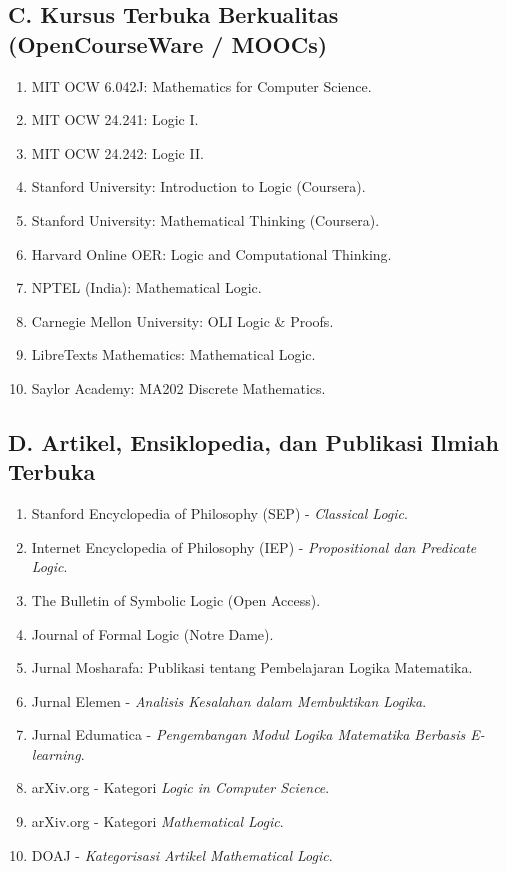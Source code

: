 \documentclass[12pt,a4paper]{article}
\begin{document}
\subsection*{C. Kursus Terbuka Berkualitas (OpenCourseWare / MOOCs)}
\begin{enumerate}[leftmargin=*, label={C\arabic*.}]
  \item MIT OCW 6.042J: Mathematics for Computer Science.
  \item MIT OCW 24.241: Logic I.
  \item MIT OCW 24.242: Logic II.
  \item Stanford University: Introduction to Logic (Coursera).
  \item Stanford University: Mathematical Thinking (Coursera).
  \item Harvard Online OER: Logic and Computational Thinking.
  \item NPTEL (India): Mathematical Logic.
  \item Carnegie Mellon University: OLI Logic \& Proofs.
  \item LibreTexts Mathematics: Mathematical Logic.
  \item Saylor Academy: MA202 Discrete Mathematics.
\end{enumerate}

\subsection*{D. Artikel, Ensiklopedia, dan Publikasi Ilmiah Terbuka}
\begin{enumerate}[leftmargin=*, label={D\arabic*.}]
  \item Stanford Encyclopedia of Philosophy (SEP) - \textit{Classical Logic}.
  \item Internet Encyclopedia of Philosophy (IEP) - \textit{Propositional dan Predicate Logic}.
  \item The Bulletin of Symbolic Logic (Open Access).
  \item Journal of Formal Logic (Notre Dame).
  \item Jurnal Mosharafa: Publikasi tentang Pembelajaran Logika Matematika.
  \item Jurnal Elemen - \textit{Analisis Kesalahan dalam Membuktikan Logika}.
  \item Jurnal Edumatica - \textit{Pengembangan Modul Logika Matematika Berbasis E-learning}.
  \item arXiv.org - Kategori \textit{Logic in Computer Science}.
  \item arXiv.org - Kategori \textit{Mathematical Logic}.
  \item DOAJ - \textit{Kategorisasi Artikel Mathematical Logic}.
\end{enumerate}
\end{document}
